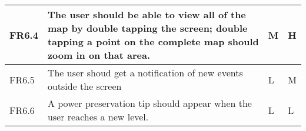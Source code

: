 \begin{longtable}{| p{1.5cm} | p{8cm} | p{1.5cm} | p{2cm} |}
   FR6.4 & The user should be able to view all of the map by double tapping the screen; double tapping a 
   point on the complete map should zoom in on that area. & M & H \\ \hline

   FR6.5 & The user shoud get a notification of new events outside the screen & L & M \\ \hline

   FR6.6 & A power preservation tip should appear when the user reaches a new level. & L & L \\ \hline

\hline
\end{longtable}
